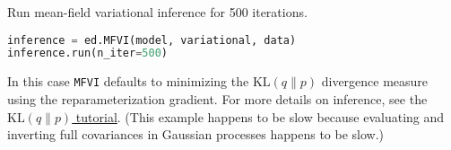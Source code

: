 Run mean-field variational inference for 500 iterations.
\begin{lstlisting}[language=Python]
inference = ed.MFVI(model, variational, data)
inference.run(n_iter=500)
\end{lstlisting}
In this case
\texttt{MFVI} defaults to minimizing the
$\text{KL}(q\|p)$ divergence measure using the reparameterization
gradient.
For more details on inference, see the \href{tut_KLqp}{$\text{KL}(q\|p)$ tutorial}.
(This example happens to be slow because evaluating and inverting full
covariances in Gaussian processes happens to be slow.)


